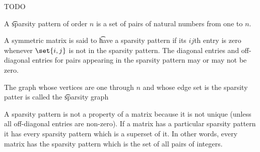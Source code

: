 
\sbasic






































\sstart
{}


TODO


A \t{sparsity pattern} of order $n$ is a set of pairs of natural numbers from one to $n$.

A symmetric matrix is said to \t{have a sparsity pattern} if its $ij$th entry is zero whenever $\set{i, j}$ is not in the sparsity pattern. The diagonal entries and off-diagonal entries for pairs appearing in the sparsity pattern may or may not be zero.

The graph whose vertices are one through $n$ and whose edge set is the sparsity patter is called the \t{sparsity graph}

A sparsity pattern is not a property of a matrix because it is not unique (unless all off-diagonal entries are non-zero). If a matrix has a particular sparsity pattern it has every sparsity pattern which is a superset of it.
In other words, every matrix has the sparsity pattern which is the set of all pairs of integers.


